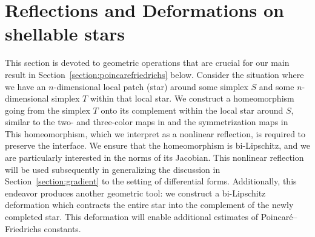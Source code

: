 \documentclass[10pt,a4paper]{article}
\begin{document}
 




















 
 
 
 
 
 
 
 
 
 
 
 
 
 
 
 
 
 
 
 
 
 
 
 
\section{Reflections and Deformations on shellable stars}\label{section:extension}

This section is devoted to geometric operations that are crucial for our main result in Section~\ref{section:poincarefriedrichs} below. 
Consider the situation where we have an $n$-dimensional local patch (star) around some simplex $S$ and some $n$-dimensional simplex $T$ within that local star. 
We construct a homeomorphism going from the simplex $T$ onto its complement within the local star around $S$,
similar to the two- and three-color maps in \cite[Sections~5.3 and~6.3]{ern2020stable} and the symmetrization maps in~\cite[Section~7.6]{Chaum_Voh_p_rob_3D_H_curl_24}
This homeomorphism, which we interpret as a nonlinear reflection, is required to preserve the interface. 
We ensure that the homeomorphism is bi-Lipschitz, and we are particularly interested in the norms of its Jacobian.
This nonlinear reflection will be used subsequently in generalizing the discussion in Section~\ref{section:gradient} to the setting of differential forms. 
Additionally, this endeavor produces another geometric tool:
we construct a bi-Lipschitz deformation which contracts the entire star into the complement of the newly completed star. 
This deformation will enable additional estimates of Poincar\'e--Friedrichs constants. 
\end{document}

